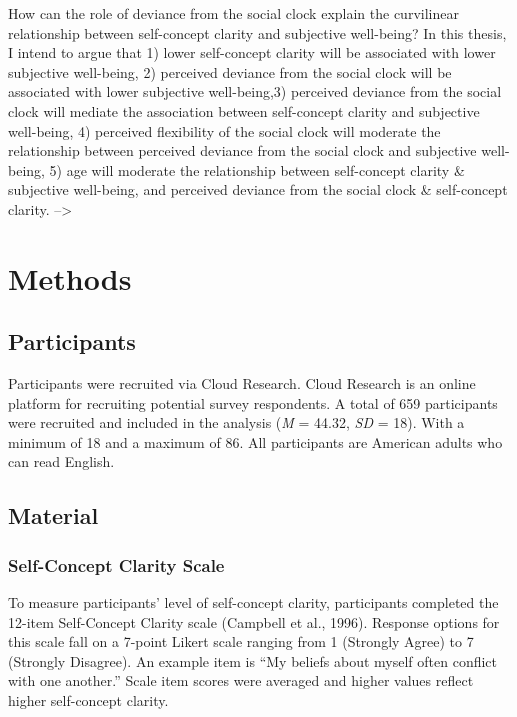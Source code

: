 \documentclass[
  man,floatsintext]{apa6}
\begin{document}
How can the role of deviance from the social clock explain the curvilinear relationship between self-concept clarity and subjective well-being?
In this thesis, I intend to argue that 1) lower self-concept clarity will be associated with lower subjective well-being, 2) perceived deviance from the social clock will be associated with lower subjective well-being,3) perceived deviance from the social clock will mediate the association between self-concept clarity and subjective well-being, 4) perceived flexibility of the social clock will moderate the relationship between perceived deviance from the social clock and subjective well-being, 5) age will moderate the relationship between self-concept clarity \& subjective well-being, and perceived deviance from the social clock \& self-concept clarity.
--\textgreater{}

\hypertarget{methods}{%
\section{Methods}\label{methods}}

\hypertarget{participants}{%
\subsection{Participants}\label{participants}}

Participants were recruited via Cloud Research. Cloud Research is an online platform for recruiting potential survey respondents. A total of 659 participants were recruited and included in the analysis (\emph{M} = 44.32, \emph{SD} = 18). With a minimum of 18 and a maximum of 86. All participants are American adults who can read English.

\hypertarget{material}{%
\subsection{Material}\label{material}}

\hypertarget{self-concept-clarity-scale}{%
\subsubsection{Self-Concept Clarity Scale}\label{self-concept-clarity-scale}}

To measure participants' level of self-concept clarity, participants completed the 12-item Self-Concept Clarity scale (Campbell et al., 1996). Response options for this scale fall on a 7-point Likert scale ranging from 1 (Strongly Agree) to 7 (Strongly Disagree). An example item is ``My beliefs about myself often conflict with one another.'' Scale item scores were averaged and higher values reflect higher self-concept clarity.
\end{document}
